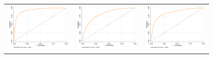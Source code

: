\documentclass[submission]{grattan}
\begin{document}
\begin{figure}
\begin{tabularx}{\linewidth}{@{}C@{}C@{}C@{}}
\includegraphics{atlas/ROC_bariatric.png} & \includegraphics{atlas/ROC_cardio.png} & \includegraphics{atlas/ROC_KR.png} \\

\end{tabularx}
\end{figure}
\end{document}
